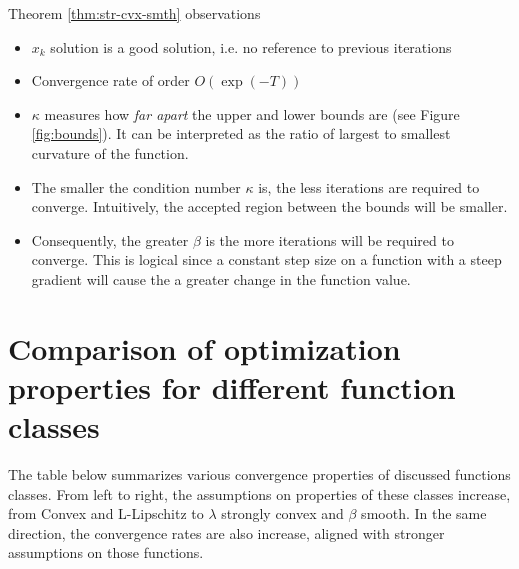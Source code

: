 \documentclass{article}
\begin{document}
Theorem \ref{thm:str-cvx-smth} observations
\begin{itemize}
    \item $x_k$ solution is a good solution, i.e. no reference to previous iterations
    \item Convergence rate of order $O(\exp(-T))$
    \item $\kappa$ measures how \textit{far apart} the upper and lower bounds are (see Figure \ref{fig:bounds}). It can be interpreted as the ratio of largest to smallest curvature of the function.
    \item The smaller the condition number $\kappa$ is, the less iterations are required to converge. Intuitively, the accepted region between the bounds will be smaller.
    \item Consequently, the greater $\beta$ is the more iterations will be required to converge. This is logical since a constant step size on a function with a steep gradient will cause the a greater change in the function value.
\end{itemize}
\pagebreak

\section{Comparison of optimization properties for different function classes }
The table below summarizes various convergence properties of discussed functions classes.  From left to right, the assumptions on properties of these classes increase, from Convex and L-Lipschitz to $\lambda$ strongly convex and $\beta$ smooth. In the same direction, the convergence rates are also increase, aligned with stronger assumptions on those functions.
\end{document}
